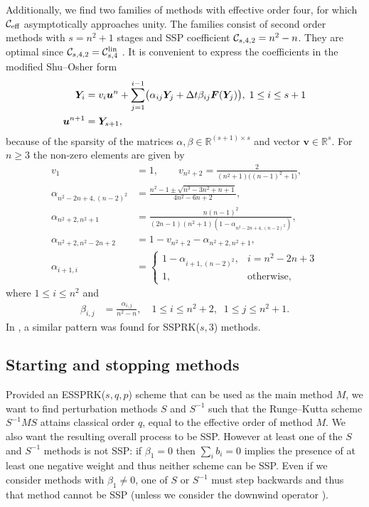 \documentclass[final]{siamltex}  %
\begin{document}
Additionally, we find two families of methods with effective order four, 
for which $\mathcal{C}_{\textnormal{eff}}$ asymptotically approaches unity.
The families consist of second order methods with $s = n^2+1$ stages and 
SSP coefficient $\mathcal{C}_{s,4,2} = n^2-n$.
They are optimal since $\mathcal{C}_{s,4,2}  = \mathcal{C}^{\textnormal{lin}}_{s,4}$ 
\cite[Theorem~5.2(c)]{Kraaijevanger1986}.
It is convenient to express the coefficients in the modified Shu--Osher form
\cite{Gottlieb2011a}
\begin{align*}
	\bm{Y}_i &= v_i\bm{u}^n + \sum_{j=1}^{i-1}\bigl(\alpha_{ij}\bm{Y}_j + \Delta t\beta_{ij}\bm{F}(\bm{Y}_j)\bigr), \; 1 \leq i \leq s+1 \\
	\bm{u}^{n+1} &= \bm{Y}_{s+1},
\end{align*}
because of the sparsity of the matrices $\alpha, \beta \in \mathbb{R}^{(s+1)\times s}$
and vector $\bm{v} \in \mathbb{R}^s$.
For $n \geq 3$ the non-zero elements are given by
\begin{align*}
	v_1 &= 1, \quad\quad v_{n^2+2} = \frac{2}{(n^2+1)\bigl((n-1)^2+1\bigr)}, \\
	\alpha_{n^2-2n+4,(n-2)^2} &= \frac{n^2-1 \pm \sqrt{n^3-3n^2+n+1}}{4n^2-6n+2}, \\ 		
	\alpha_{n^2+2,n^2+1} &= \frac{n(n-1)^2}{(2n-1)(n^2+1)(1-\alpha_{n^2-2n+4,(n-2)^2})}, \\
	\alpha_{n^2+2,n^2-2n+2} &= 1 - v_{n^2+2} - \alpha_{n^2+2,n^2+1}, \\
	\alpha_{i+1,i} &= \begin{cases} 
								1 - \alpha_{i+1,(n-2)^2}, & i = n^2-2n+3 \\
								1,  &\mbox{otherwise,}
							\end{cases}
\end{align*}
where $ 1 \leq i \leq n^2$ and 
\begin{align*}
	\beta_{i,j} & = \frac{\alpha_{i,j}}{n^2-n}, \quad 1 \leq i \leq n^2+2, \;\; 1 \leq j \leq n^2+1.
\end{align*}
In \cite[\S~6.2.2]{Gottlieb2011a}, a similar pattern was found for SSPRK($s,3$) methods.

\subsection{Starting and stopping methods}\label{subsec:starting_stopping}
Provided an ESSPRK($s,q,p$) scheme that can be used as the main 
method $M$, we want to find perturbation methods $S$ and $S^{-1}$ such that the 
Runge--Kutta scheme $S^{-1}MS$ attains classical order $q$, equal to the 
effective order of method $M$.
We also want the resulting overall process to be SSP.
However at least one of the $S$ and $S^{-1}$ methods is not SSP:
if $\beta_1 = 0$ then $\sum_i b_i = 0$ implies the presence of at
least one negative weight and thus neither scheme can be SSP.
Even if we consider methods with $\beta_1 \neq 0$, one of $S$ or
$S^{-1}$ must step backwards and thus that method cannot be SSP
(unless we consider the downwind operator
\cite{Ruuth2004,Gottlieb/Ruuth:SSPfastdownwind,Ketcheson:2011:downwind}).
\end{document}
